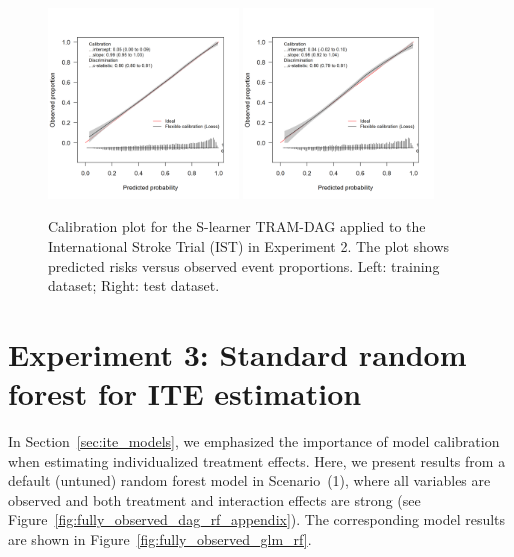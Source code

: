 \begin{figure}[htbp]
\centering
\includegraphics[width=0.45\textwidth]{img/results_IST/IST_TRAM_DAG_slearner_train_calibration_plot.png}
\includegraphics[width=0.45\textwidth]{img/results_IST/IST_TRAM_DAG_slearner_test_calibration_plot.png}
\caption{Calibration plot for the S-learner TRAM-DAG applied to the International Stroke Trial (IST) in Experiment 2. The plot shows predicted risks versus observed event proportions. Left: training dataset; Right: test dataset.}
\label{fig:calibration_IST_TRAM_DAG}
\end{figure}


\clearpage


\section{Experiment 3: Standard random forest for ITE estimation} \label{sec:default_rf_ite}

In Section~\ref{sec:ite_models}, we emphasized the importance of model calibration when estimating individualized treatment effects. Here, we present results from a default (untuned) random forest model in Scenario~(1), where all variables are observed and both treatment and interaction effects are strong (see Figure~\ref{fig:fully_observed_dag_rf_appendix}). The corresponding model results are shown in Figure~\ref{fig:fully_observed_glm_rf}.


